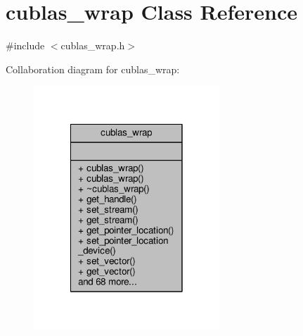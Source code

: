 \hypertarget{classcublas__wrap}{\section{cublas\-\_\-wrap Class Reference}
\label{classcublas__wrap}
}


{\ttfamily \#include $<$cublas\-\_\-wrap.\-h$>$}



Collaboration diagram for cublas\-\_\-wrap\-:
\nopagebreak
\begin{figure}[H]
\begin{center}
\leavevmode
\includegraphics[width=198pt]{classcublas__wrap__coll__graph}
\end{center}
\end{figure}
